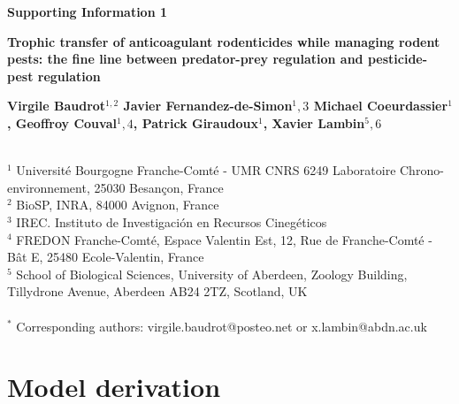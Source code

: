 \documentclass[11pt]{article}
\begin{document}
\setcounter{table}{0}
\renewcommand{\thetable}{S\arabic{table}}%
\setcounter{figure}{0}
\renewcommand{\thefigure}{S\arabic{figure}}%
\setcounter{equation}{0}
\renewcommand{\theequation}{S\arabic{equation}}%


\begin{center}
	\huge\textbf{
	Supporting Information 1
	}\par
\end{center}

\begin{center}
	\Large\textbf{
		Trophic transfer of anticoagulant rodenticides while managing rodent pests: the fine line between predator-prey regulation and pesticide-pest regulation
	}\par
\end{center}

\vspace{.5cm}

\begin{center}
	\large\textbf{
		Virgile Baudrot$^{1,2}$ 
		Javier Fernandez-de-Simon$^1,3$
		Michael Coeurdassier$^1$,
		Geoffroy Couval$^1,4$,
		Patrick Giraudoux$^1$,
		Xavier Lambin$^5,6$		
	}\par	
\end{center}
~\\
$^1$ Université Bourgogne Franche-Comté - UMR CNRS 6249 Laboratoire Chrono-environnement, 25030 Besançon, France\\
$^2$ BioSP, INRA, 84000 Avignon, France\\
$^3$ IREC. Instituto de Investigación en Recursos Cinegéticos\\
$^4$ FREDON Franche-Comté, Espace Valentin Est, 12, Rue de Franche-Comté - Bât E, 25480 Ecole-Valentin, France\\
$^5$ School of Biological Sciences, University of Aberdeen, Zoology Building, Tillydrone Avenue, Aberdeen AB24 2TZ, Scotland, UK\\
~\\
$^*$ Corresponding authors: virgile.baudrot@posteo.net or x.lambin@abdn.ac.uk


\newpage


\section{Model derivation}
\end{document}

